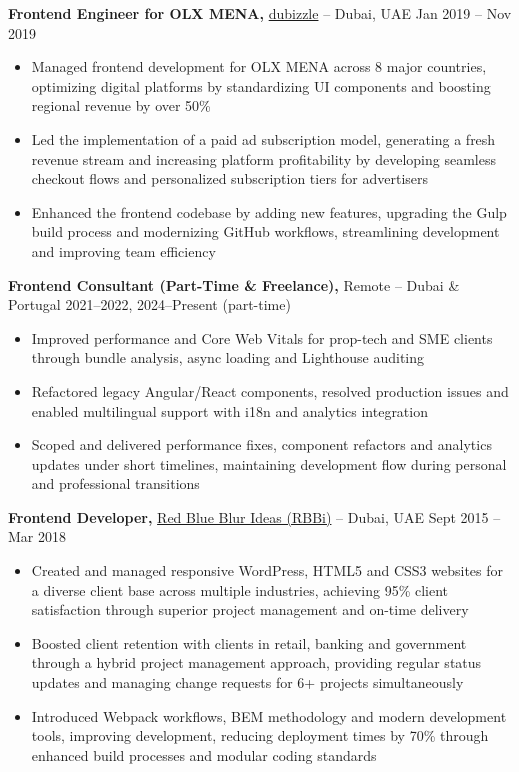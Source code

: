 \documentclass[10pt,letterpaper]{article}
\begin{document}
\textbf{Frontend Engineer for OLX MENA,} \href{https://www.dubizzle.com/}{dubizzle} -- Dubai, UAE \hfill Jan 2019 -- Nov 2019 \\
\vspace{-5pt}
\begin{itemize}
  \item Managed frontend development for OLX MENA across 8 major countries, optimizing digital platforms by standardizing UI components and boosting regional revenue by over 50\%
  \item Led the implementation of a paid ad subscription model, generating a fresh revenue stream and increasing platform profitability by developing seamless checkout flows and personalized subscription tiers for advertisers
  \item Enhanced the frontend codebase by adding new features, upgrading the Gulp build process and modernizing GitHub workflows, streamlining development and improving team efficiency
\end{itemize}

\textbf{Frontend Consultant (Part-Time \& Freelance),} Remote -- Dubai \& Portugal \hfill 2021--2022, 2024--Present (part-time)
\vspace{-5pt}
\begin{itemize}
  \item Improved performance and Core Web Vitals for prop-tech and SME clients through bundle analysis, async loading and Lighthouse auditing
  \item Refactored legacy Angular/React components, resolved production issues and enabled multilingual support with i18n and analytics integration
  \item Scoped and delivered performance fixes, component refactors and analytics updates under short timelines, maintaining development flow during personal and professional transitions
\end{itemize}


\textbf{Frontend Developer,} \href{https://www.rbbideas.com/}{Red Blue Blur Ideas (RBBi)} -- Dubai, UAE \hfill Sept 2015 -- Mar 2018 \\
\vspace{-5pt}
\begin{itemize}
  \item Created and managed responsive WordPress, HTML5 and CSS3 websites for a diverse client base across multiple industries, achieving 95\% client satisfaction through superior project management and on-time delivery
  \item Boosted client retention with clients in retail, banking and government through a hybrid project management approach, providing regular status updates and managing change requests for 6+ projects simultaneously
  \item Introduced Webpack workflows, BEM methodology and modern development tools, improving development, reducing deployment times by 70\% through enhanced build processes and modular coding standards
\end{itemize}
\end{document}
